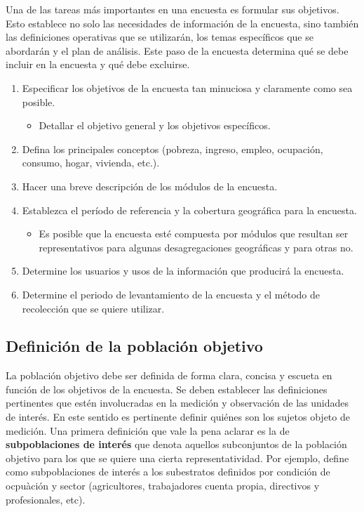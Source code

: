 \documentclass[12pt,spanish,]{book}
\providecommand{\tightlist}{%
  \setlength{\itemsep}{0pt}\setlength{\parskip}{0pt}}
\begin{document}
Una de las tareas más importantes en una encuesta es formular sus objetivos. Esto establece no solo las necesidades de información de la encuesta, sino también las definiciones operativas que se utilizarán, los temas específicos que se abordarán y el plan de análisis. Este paso de la encuesta determina qué se debe incluir en la encuesta y qué debe excluirse.

\begin{enumerate}
\def\labelenumi{\arabic{enumi}.}
\tightlist
\item
  Especificar los objetivos de la encuesta tan minuciosa y claramente como sea posible.

  \begin{itemize}
  \tightlist
  \item
    Detallar el objetivo general y los objetivos específicos.
  \end{itemize}
\item
  Defina los principales conceptos (pobreza, ingreso, empleo, ocupación, consumo, hogar, vivienda, etc.).
\item
  Hacer una breve descripción de los módulos de la encuesta.
\item
  Establezca el período de referencia y la cobertura geográfica para la encuesta.

  \begin{itemize}
  \tightlist
  \item
    Es posible que la encuesta esté compuesta por módulos que resultan ser representativos para algunas desagregaciones geográficas y para otras no.
  \end{itemize}
\item
  Determine los usuarios y usos de la información que producirá la encuesta.
\item
  Determine el periodo de levantamiento de la encuesta y el método de recolección que se quiere utilizar.
\end{enumerate}

\hypertarget{definicion-de-la-poblacion-objetivo}{%
\subsection*{Definición de la población objetivo}\label{definicion-de-la-poblacion-objetivo}}

La población objetivo debe ser definida de forma clara, concisa y escueta en función de los objetivos de la encuesta. Se deben establecer las definiciones pertinentes que estén involucradas en la medición y observación de las unidades de interés. En este sentido es pertinente definir quiénes son los sujetos objeto de medición. Una primera definición que vale la pena aclarar es la de \textbf{subpoblaciones de interés} que denota aquellos subconjuntos de la población objetivo para los que se quiere una cierta representatividad. Por ejemplo, \textcite{INE_ES_2002} define como subpoblaciones de interés a los subestratos definidos por condición de ocpuàción y sector (agricultores, trabajadores cuenta propia, directivos y profesionales, etc).
\end{document}
